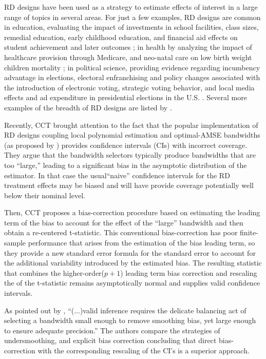 \documentclass[12pt,fleqn]{article}
\begin{document}
RD designs have been used as a strategy to estimate effects of interest in a large range of topics in several areas. For just a few examples, RD designs are common in education, evaluating the impact of investments in school facilities, class sizes, remedial education, early childhood education, and financial aid effects on student achievement and later outcomes \citep{cellini2010,urquiola2009,jacoblefgren2004,ludwig2007,vdk2002}; in health by analyzing the impact of healthcare provision through Medicare, and neo-natal care on low birth weight children mortality \citep{Card2009,barreca2011saving}; in political science, providing evidence regarding incumbency advantage in elections, electoral enfranchising and policy changes associated with the introduction of electronic voting, strategic voting behavior, and local media effects and ad expenditure in presidential elections in the U.S. \citep{lee2008,Caughey2011,erikson2015,Fujiwara2015,Fujiwara2011,keele2014geographic}. Several more examples of the breadth of RD designs are listed by \cite{lee2010}.


Recently, CCT brought attention to the fact that the popular implementation of RD designs coupling local polynomial estimation and optimal-AMSE bandwidths (as proposed by \cite{IK})
provides confidence intervals (CIs) with incorrect coverage. They argue that the bandwidth selectors typically produce bandwidths that are too ``large,'' leading to a significant bias in the asymptotic distribution of the estimator. In that case the usual``naive'' confidence intervals for the RD treatment effects may be biased and will have provide coverage potentially well below their nominal level.

Then, CCT proposes a bias-correction procedure based on estimating the leading term of the bias to account for the effect of the ``large'' bandwidth and then obtain a re-centered t-statistic.    This conventional bias-correction has poor finite-sample performance that arises from the estimation of the bias leading term, so they provide a new standard error formula for the standard error to  account for the additional variability introduced by the estimated bias. The resulting statistic that combines the higher-order($p+1$) leading term bias correction and rescaling the of the t-statistic remains asymptotically normal and supplies valid confidence intervals.

As pointed out by \cite{ccf2016}, ``(...)valid inference
requires the delicate balancing act of selecting a bandwidth small enough
to remove smoothing bias, yet large enough to ensure adequate precision.''
The authors compare the strategies of undersmoothing, and explicit bias 
correction concluding that direct bias-correction with the corresponding 
rescaling of the CI's is a superior approach.
\end{document}
